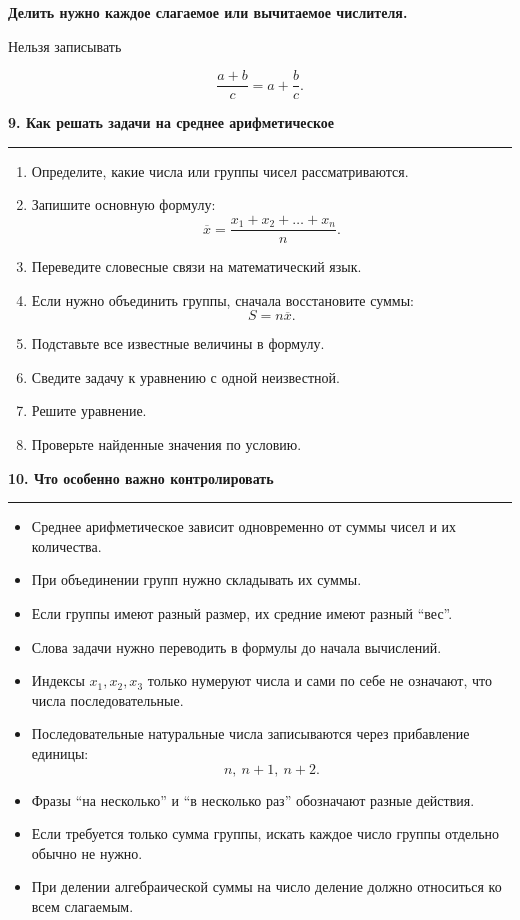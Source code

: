 \documentclass[a4paper,12pt]{article}
\newcommand{\topicsection}[1]{%
    \vspace{0.7em}
    {\Large\bfseries\color{darkaccent}#1}\par
    \vspace{0.15em}
    {\color{accent}\rule{\linewidth}{0.7pt}}
    \vspace{0.35em}
}
\newcommand{\important}[1]{%
    \vspace{0.35em}
    \noindent
    \begin{minipage}{\linewidth}
        \color{darkaccent}\bfseries #1
    \end{minipage}
    \vspace{0.25em}
}
\begin{document}
\important{Делить нужно каждое слагаемое или вычитаемое числителя.}

Нельзя записывать

\[
\frac{a+b}{c}
=
a+\frac{b}{c}.
\]

\topicsection{9. Как решать задачи на среднее арифметическое}

\begin{enumerate}
    \item Определите, какие числа или группы чисел рассматриваются.

    \item Запишите основную формулу:
    \[
    \overline{x}
    =
    \frac{x_1+x_2+\dots+x_n}{n}.
    \]

    \item Переведите словесные связи на математический язык.

    \item Если нужно объединить группы, сначала восстановите суммы:
    \[
    S=n\overline{x}.
    \]

    \item Подставьте все известные величины в формулу.

    \item Сведите задачу к уравнению с одной неизвестной.

    \item Решите уравнение.

    \item Проверьте найденные значения по условию.
\end{enumerate}

\topicsection{10. Что особенно важно контролировать}

\begin{itemize}
    \item Среднее арифметическое зависит одновременно от суммы чисел и их количества.

    \item При объединении групп нужно складывать их суммы.

    \item Если группы имеют разный размер, их средние имеют разный ``вес''.

    \item Слова задачи нужно переводить в формулы до начала вычислений.

    \item Индексы \(x_1,x_2,x_3\) только нумеруют числа и сами по себе не означают, что числа последовательные.

    \item Последовательные натуральные числа записываются через прибавление единицы:
    \[
    n,\ n+1,\ n+2.
    \]

    \item Фразы ``на несколько'' и ``в несколько раз'' обозначают разные действия.

    \item Если требуется только сумма группы, искать каждое число группы отдельно обычно не нужно.

    \item При делении алгебраической суммы на число деление должно относиться ко всем слагаемым.
\end{itemize}
\end{document}
